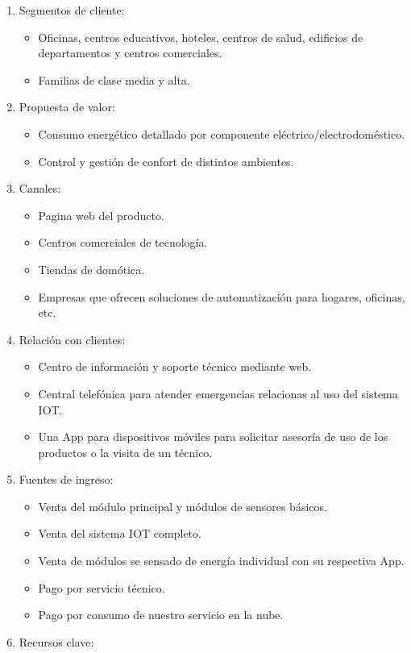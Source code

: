 \documentclass[11pt]{charter}
\begin{document}
\begin{enumerate}
\item Segmentos de cliente:
\begin{itemize}
\item Oficinas, centros educativos, hoteles, centros de salud, edificios de departamentos y centros comerciales.  
\item Familias de clase media y alta.
\end{itemize}
\item Propuesta de valor:
\begin{itemize}
\item Consumo energético detallado por componente eléctrico/electrodoméstico.
\item Control y gestión de confort de distintos ambientes.
\end{itemize}
\item Canales:
   \begin{itemize}
\item Pagina web del producto.
\item Centros comerciales de tecnología.
\item Tiendas de domótica.
\item Empresas que ofrecen soluciones de automatización para hogares, oficinas, etc.
\end{itemize}
\item Relación con clientes:
\begin{itemize}
\item Centro de información y soporte técnico mediante web.
\item Central telefónica para atender emergencias relacionas al uso del sistema IOT.
\item Una App para dispositivos móviles para solicitar asesoría de uso de los productos o la visita de un técnico. 
\end{itemize}
\item Fuentes de ingreso:
\begin{itemize}
\item Venta del módulo principal y módulos de sensores básicos.
\item Venta del sistema IOT completo.
\item Venta de módulos se sensado de energía individual con su respectiva App.
\item Pago por servicio técnico.
\item Pago por consumo de nuestro servicio en la nube.
\end{itemize}
\item Recursos clave:

\end{enumerate}
\end{document}
